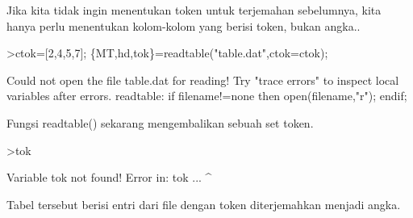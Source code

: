\documentclass[12pt,arial,letterpaper]{book}
\begin{document}
\begin{eulercomment}
\begin{eulercomment}
\begin{eulercomment}
\begin{eulercomment}
\begin{eulercomment}
\begin{eulercomment}
\begin{eulercomment}
\begin{eulercomment}
\begin{eulercomment}
\begin{eulercomment}
\begin{eulercomment}
\begin{eulercomment}
\begin{eulercomment}
\begin{eulercomment}
\begin{eulercomment}
\begin{eulercomment}
\begin{eulercomment}
\begin{eulercomment}
\begin{eulercomment}
\begin{eulercomment}
\begin{eulercomment}
\begin{eulercomment}
\begin{eulercomment}
\begin{eulercomment}
\begin{eulercomment}
\begin{eulercomment}
\begin{eulercomment}
\begin{eulercomment}
\begin{eulercomment}
\begin{eulercomment}
\begin{eulercomment}
\begin{eulercomment}
\begin{eulercomment}
Jika kita tidak ingin menentukan token untuk terjemahan sebelumnya,
kita hanya perlu menentukan kolom-kolom yang berisi token, bukan
angka..
\end{eulercomment}
\begin{eulerprompt}
>ctok=[2,4,5,7]; \{MT,hd,tok\}=readtable("table.dat",ctok=ctok);
\end{eulerprompt}
\begin{euleroutput}
  Could not open the file
  table.dat
  for reading!
  Try "trace errors" to inspect local variables after errors.
  readtable:
      if filename!=none then open(filename,"r"); endif;
\end{euleroutput}
\begin{eulercomment}
Fungsi readtable() sekarang mengembalikan sebuah set token.
\end{eulercomment}
\begin{eulerprompt}
>tok
\end{eulerprompt}
\begin{euleroutput}
  Variable tok not found!
  Error in:
  tok ...
     ^
\end{euleroutput}
\begin{eulercomment}
Tabel tersebut berisi entri dari file dengan token diterjemahkan
menjadi angka.


\end{eulercomment}
\end{eulercomment}
\end{eulercomment}
\end{eulercomment}
\end{eulercomment}
\end{eulercomment}
\end{eulercomment}
\end{eulercomment}
\end{eulercomment}
\end{eulercomment}
\end{eulercomment}
\end{eulercomment}
\end{eulercomment}
\end{eulercomment}
\end{eulercomment}
\end{eulercomment}
\end{eulercomment}
\end{eulercomment}
\end{eulercomment}
\end{eulercomment}
\end{eulercomment}
\end{eulercomment}
\end{eulercomment}
\end{eulercomment}
\end{eulercomment}
\end{eulercomment}
\end{eulercomment}
\end{eulercomment}
\end{eulercomment}
\end{eulercomment}
\end{eulercomment}
\end{eulercomment}
\end{eulercomment}
\end{document}
